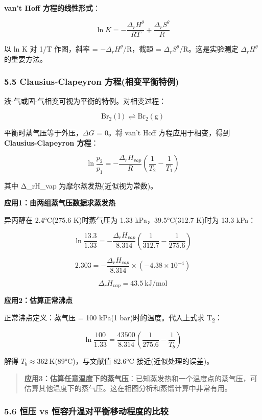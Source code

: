 \documentclass[a4paper,11pt]{ctexart}
\newcommand{\箭}{\ensuremath{\rightarrow}}
\newcommand{\左箭}{\ensuremath{\leftarrow}}
\newcommand{\上箭}{\ensuremath{\uparrow}}
\newcommand{\下箭}{\ensuremath{\downarrow}}
\newcommand{\衡}{\ensuremath{\rightleftharpoons}}
\newcommand{\双箭}{\ensuremath{\leftrightarrow}}
\newcommand{\约等于}{\ensuremath{\approx}}
\newcommand{\小于等于}{\ensuremath{\leq}}
\newcommand{\大于等于}{\ensuremath{\geq}}
\newcommand{\不等于}{\ensuremath{\neq}}
\newcommand{\西格马}{\ensuremath{\sigma}}
\newcommand{\派}{\ensuremath{\pi}}
\begin{document}
\textbf{van't Hoff 方程的线性形式}：

\[
\ln K = -\frac{\Delta_r H^\theta}{RT} + \frac{\Delta_r S^\theta}{R}
\]

以 ln K 对 1/T 作图，斜率 = −\(\Delta_r H^\theta\)/R，截距 = \(\Delta_r S^\theta\)/R。这是实验测定 \(\Delta_r H^\theta\) 的重要方法。

\subsubsection{5.5 Clausius-Clapeyron 方程(相变平衡特例)}\label{clausius-clapeyron-ux65b9ux7a0bux76f8ux53d8ux5e73ux8861ux7279ux4f8b}

液-气或固-气相变可视为平衡的特例。对相变过程：

\[
\mathrm{Br_2(l) \rightleftharpoons Br_2(g)}
\]

平衡时蒸气压等于外压，\(\Delta G\) = 0。将 van't Hoff 方程应用于相变，得到 \textbf{Clausius-Clapeyron 方程}：

\[
\boxed{\ln\frac{p_2}{p_1} = -\frac{\Delta_r H_{vap}}{R}\left(\frac{1}{T_2} - \frac{1}{T_1}\right)}
\]

其中 Δ\_rH\_vap 为摩尔蒸发热(近似视为常数)。

\textbf{应用1：由两组蒸气压数据求蒸发热}

异丙醇在 2.4°C(275.6 K)时蒸气压为 1.33 kPa，39.5°C(312.7 K)时为 13.3 kPa：

\[
\ln\frac{13.3}{1.33} = -\frac{\Delta_r H_{vap}}{8.314}\left(\frac{1}{312.7} - \frac{1}{275.6}\right)
\]

\[
2.303 = -\frac{\Delta_r H_{vap}}{8.314} \times (-4.38 \times 10^{-4})
\]

\[
\Delta_r H_{vap} = 43.5\ \mathrm{kJ/mol}
\]

\textbf{应用2：估算正常沸点}

正常沸点定义：蒸气压 = 100 kPa(1 bar)时的温度。代入上式求 T\textsubscript{2}：

\[
\ln\frac{100}{1.33} = \frac{43500}{8.314}\left(\frac{1}{275.6} - \frac{1}{T_b}\right)
\]

解得 \(T_b \approx 362\ \mathrm{K}\)(89°C)，与文献值 82.6°C 接近(近似处理的误差)。

\begin{quote}
\textbf{应用3：估算任意温度下的蒸气压}：已知蒸发热和一个温度点的蒸气压，可估算其他温度下的蒸气压。这在相图分析和蒸馏计算中非常有用。
\end{quote}

\subsubsection{5.6 恒压 vs 恒容升温对平衡移动程度的比较}\label{ux6052ux538b-vs-ux6052ux5bb9ux5347ux6e29ux5bf9ux5e73ux8861ux79fbux52a8ux7a0bux5ea6ux7684ux6bd4ux8f83}
\end{document}

